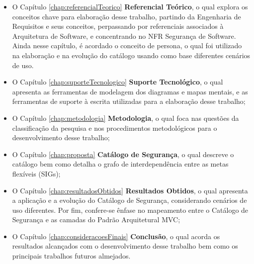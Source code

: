 \begin{itemize}
	\item O Capítulo \ref{chap:referencialTeorico} \textbf{Referencial Teórico}, o qual explora os conceitos chave para elaboração desse trabalho, partindo da Engenharia de Requisitos e seus conceitos, perpassando por referenciais associados à Arquitetura de Software, e concentrando no NFR Segurança de Software. Ainda nesse capítulo, é acordado o conceito de persona, o qual foi utilizado na elaboração e na evolução do catálogo usando como base diferentes cenários de uso.
	
	\item  O Capítulo \ref{chap:suporteTecnologico} \textbf{Suporte Tecnológico}, o qual apresenta as ferramentas de modelagem dos diagramas e mapas mentais, e as ferramentas de suporte à escrita utilizadas para a elaboração desse trabalho;
	
	\item O Capítulo \ref{chap:metodologia} \textbf{Metodologia}, o qual foca nas questões da classificação da pesquisa e nos procedimentos metodológicos para o desenvolvimento desse trabalho;
	
	\item O Capítulo \ref{chap:proposta} \textbf{Catálogo de Segurança}, o qual descreve o catálogo bem como detalha o grafo de interdependência entre as metas flexíveis (SIGs);
	
	\item  O Capítulo  \ref{chap:resultadosObtidos} \textbf{Resultados Obtidos}, o qual apresenta a aplicação e a evolução do Catálogo de Segurança, considerando cenários de uso diferentes. Por fim, confere-se ênfase no mapeamento entre o Catálogo de Segurança e as camadas do Padrão Arquitetural MVC;
	
	\item  O Capítulo \ref{chap:consideracoesFinais} \textbf{Conclusão}, o qual acorda os resultados alcançados com o desenvolvimento desse trabalho bem como os principais trabalhos futuros almejados. 
\end{itemize}

